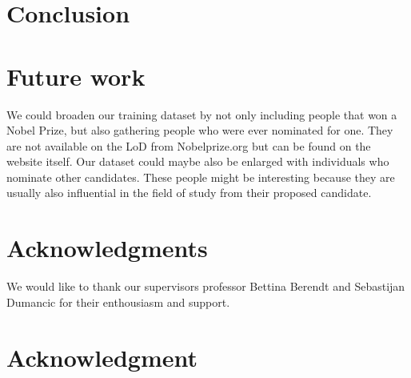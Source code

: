 \documentclass[11pt,journal,compsoc]{IEEEtran}
\begin{document}






\section{Conclusion}

\section{Future work}

We could broaden our training dataset by not only including people that won a Nobel Prize, but also gathering people who were ever nominated for one. They are not available on the LoD from Nobelprize.org but can be found on the website itself\cite{nominated}.
Our dataset could maybe also be enlarged with individuals who nominate other candidates. These people might be interesting because they are usually also influential in the field of study from their proposed candidate.



\ifCLASSOPTIONcompsoc
  \section*{Acknowledgments}
  We would like to thank our supervisors professor Bettina Berendt and Sebastijan Dumancic for their enthousiasm and support.
\else
  \section*{Acknowledgment}
\fi


%
\end{document}
